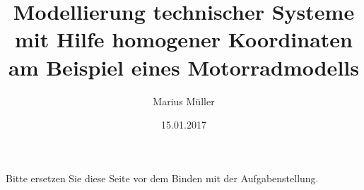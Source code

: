 \subject{Studienarbeit}




\author{Marius M\"uller}
\title{Modellierung technischer Systeme mit Hilfe homogener Koordinaten am Beispiel eines Motorradmodells}
\date{15.01.2017}
\maketitleITVS



\newpage
\thispagestyle{empty}
\null\vfill
\begin{center}
	Bitte ersetzen Sie diese Seite vor dem Binden mit der Aufgabenstellung.
\end{center}
\vfill

